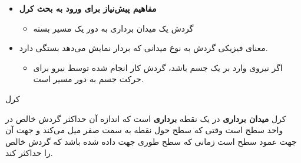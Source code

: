 \ELhold


\begin{ELunit}

\begin{itemize}
\tightlist
\item
  \textbf{مفاهیم پیش‌نیاز برای ورود به بحث کرل}

  \begin{itemize}
  \tightlist
  \item
    گردش یک میدان برداری به دور یک مسیر بسته
  \end{itemize}
\end{itemize}


\begin{itemize}
\tightlist
\item
  معنای فیزیکی گردش به نوع میدانی که بردار  نمایش می‌دهد بستگی دارد.

  \begin{itemize}
  \tightlist
  \item
    اگر  نیروی وارد بر یک جسم باشد، گردش  کار انجام شده توسط نیرو برای حرکت جسم به دور مسیر است.
  \end{itemize}
\end{itemize}

\end{ELunit}

\begin{ELdefinition}{کرل}

کرل \textbf{میدان برداری}  در یک نقطه \textbf{برداری} است که اندازه آن حداکثر گردش خالص  در واحد سطح است وقتی که سطح حول نقطه به سمت صفر میل می‌کند و جهت آن جهت عمود سطح است زمانی که سطح طوری جهت داده شده باشد که گردش خالص را حداکثر کند.


\end{ELdefinition}

